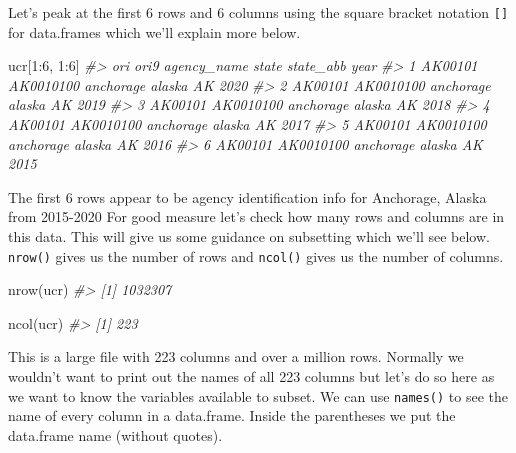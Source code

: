 \documentclass[
]{krantz}
\makeatletter
\newenvironment{Shaded}{\begin{snugshade}}{\end{snugshade}}
\newcommand{\CommentTok}[1]{\textcolor[rgb]{0.37,0.37,0.37}{\textit{#1}}}
\newcommand{\DecValTok}[1]{\textcolor[rgb]{0.06,0.06,0.06}{#1}}
\newcommand{\FunctionTok}[1]{\textcolor[rgb]{0,0,0}{#1}}
\newcommand{\NormalTok}[1]{#1}
\newcommand{\SpecialCharTok}[1]{\textcolor[rgb]{0,0,0}{#1}}
\newenvironment{kframe}{%
\medskip{}
\setlength{\fboxsep}{.8em}
 \def\at@end@of@kframe{}%
 \ifinner\ifhmode%
  \def\at@end@of@kframe{\end{minipage}}%
  \begin{minipage}{\columnwidth}%
 \fi\fi%
 \def\FrameCommand##1{\hskip\@totalleftmargin \hskip-\fboxsep
 \colorbox{shadecolor}{##1}\hskip-\fboxsep
     \hskip-\linewidth \hskip-\@totalleftmargin \hskip\columnwidth}%
 \MakeFramed {\advance\hsize-\width
   \@totalleftmargin\z@ \linewidth\hsize
   \@setminipage}}%
 {\par\unskip\endMakeFramed%
 \at@end@of@kframe}
\renewenvironment{Shaded}{\begin{kframe}}{\end{kframe}}
\makeatother
\begin{document}
Let's peak at the first 6 rows and 6 columns using the square bracket notation \texttt{{[}{]}} for data.frames which we'll explain more below.

\begin{Shaded}
\begin{Highlighting}[]
\NormalTok{ucr[}\DecValTok{1}\SpecialCharTok{:}\DecValTok{6}\NormalTok{, }\DecValTok{1}\SpecialCharTok{:}\DecValTok{6}\NormalTok{]}
\CommentTok{\#\textgreater{}       ori      ori9 agency\_name  state state\_abb year}
\CommentTok{\#\textgreater{} 1 AK00101 AK0010100   anchorage alaska        AK 2020}
\CommentTok{\#\textgreater{} 2 AK00101 AK0010100   anchorage alaska        AK 2019}
\CommentTok{\#\textgreater{} 3 AK00101 AK0010100   anchorage alaska        AK 2018}
\CommentTok{\#\textgreater{} 4 AK00101 AK0010100   anchorage alaska        AK 2017}
\CommentTok{\#\textgreater{} 5 AK00101 AK0010100   anchorage alaska        AK 2016}
\CommentTok{\#\textgreater{} 6 AK00101 AK0010100   anchorage alaska        AK 2015}
\end{Highlighting}
\end{Shaded}

The first 6 rows appear to be agency identification info for Anchorage, Alaska from 2015-2020 For good measure let's check how many rows and columns are in this data. This will give us some guidance on subsetting which we'll see below. \texttt{nrow()} gives us the number of rows and \texttt{ncol()} gives us the number of columns.

\begin{Shaded}
\begin{Highlighting}[]
\FunctionTok{nrow}\NormalTok{(ucr)}
\CommentTok{\#\textgreater{} [1] 1032307}
\end{Highlighting}
\end{Shaded}

\begin{Shaded}
\begin{Highlighting}[]
\FunctionTok{ncol}\NormalTok{(ucr)}
\CommentTok{\#\textgreater{} [1] 223}
\end{Highlighting}
\end{Shaded}

This is a large file with 223 columns and over a million rows. Normally we wouldn't want to print out the names of all 223 columns but let's do so here as we want to know the variables available to subset. We can use \texttt{names()} to see the name of every column in a data.frame. Inside the parentheses we put the data.frame name (without quotes).
\end{document}
